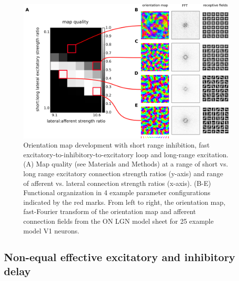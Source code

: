 \documentclass[a4paper,10pt]{article}
\begin{document}
\begin{figure}[htpb!] 
\centering
\includegraphics[width=16cm]{./SVG/Figure3/figure3.png}
\caption{Orientation map development with short range inhibition, fast excitatory-to-inhibitory-to-excitatory loop and long-range excitation. (A) Map quality (see Materials and Methods) at a range of 
short vs. long range excitatory connection strength ratios (y-axis) and range of afferent vs. lateral connection strength ratios (x-axis). (B-E) Functional organization in 4 example parameter configurations 
indicated by the red marks. From left to right, the orientation map, fast-Fourier transform of the orientation map and afferent connection fields from the ON LGN model sheet for 25 example model V1 neurons.}
\label{fig:figure3}
\end{figure} 

\subsection{Non-equal effective excitatory and inhibitory delay} \label{sec:SM4}
\end{document}
